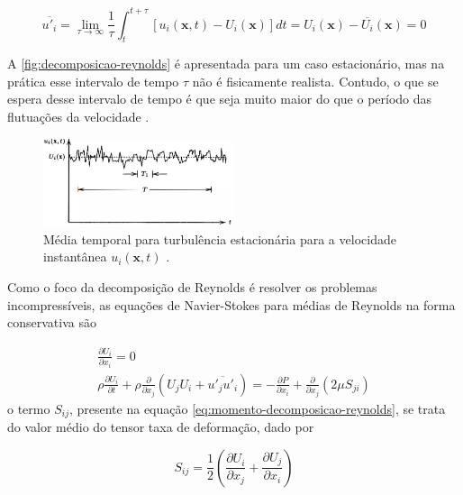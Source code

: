 \begin{equation}
	\overline{u'_{i}} = \lim_{\tau \rightarrow \infty} \frac{1}{\tau}\int_{t}^{t+\tau} \left[u_i(\textbf{x},t) - U_i(\textbf{x}) \right] dt = U_i(\textbf{x}) - \overline{U_{i}}(\textbf{x}) = 0
\end{equation}

A \autoref{fig:decomposicao-reynolds} é apresentada para um caso estacionário, mas na prática esse intervalo de tempo $\tau$ não é fisicamente realista. Contudo, o que se espera desse intervalo de tempo é que seja muito maior do que o período das flutuações da velocidade \cite{Wilcox2006}. 

\begin{figure}[!ht]
	\centering
	\includegraphics[width=0.5\textwidth]{foto01-decomposicao-reynolds.png}   
	\caption[Média temporal para turbulência estacionária para a velocidade instantânea $u_i(\textbf{x},t)$ \cite{Wilcox2006}]{Média temporal para turbulência estacionária para a velocidade instantânea $u_i(\textbf{x},t)$ \cite{Wilcox2006}.}
	\label{fig:decomposicao-reynolds}
\end{figure}

Como o foco da decomposição de Reynolds é resolver os problemas incompressíveis, as equações de Navier-Stokes para médias de Reynolds na forma conservativa são

\begin{gather}
	\label{eq:continuidade-decomposicao-reynolds}
	\frac{\partial U_i}{\partial x_i} = 0 \\
	\label{eq:momento-decomposicao-reynolds}
	\rho\frac{\partial U_i}{\partial t} + \rho\frac{\partial}{\partial x_j}\left(U_{j}U_{i} + \overline{u'_j u'_i} \right) = -\frac{\partial P}{\partial x_i} + \frac{\partial}{\partial x_j}\left(2\mu S_{ji}\right)
\end{gather}
%
o termo $S_{ij}$, presente na equação \ref{eq:momento-decomposicao-reynolds}, se trata do valor médio do tensor taxa de deformação, dado por

\begin{equation}
    \label{eq:tensor-medio-taxadeformacao}
    S_{ij} = \frac{1}{2}\left(\frac{\partial U_i}{\partial x_j} + \frac{\partial U_j}{\partial x_i} \right)
\end{equation}

